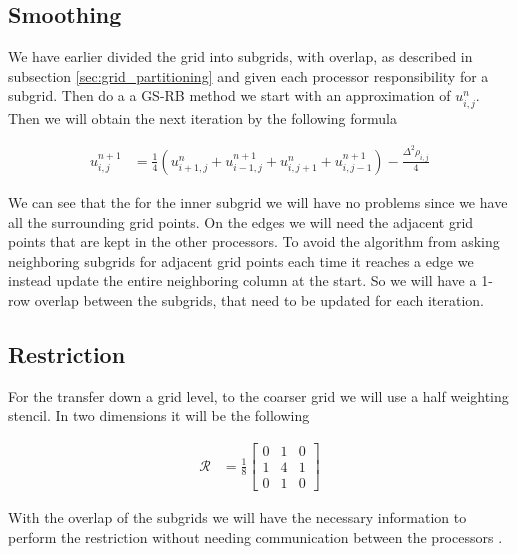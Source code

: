 	\subsection{Smoothing}

		We have earlier divided the grid into subgrids, with overlap, as described in subsection \ref{sec:grid_partitioning} and given each processor responsibility for a subgrid. Then do a a GS-RB method we start with an approximation of \(u^{n}_{i,j}\). Then we will obtain the next iteration by the following formula

		\begin{align}
			u^{n+1}_{i,j} &= \frac{1}{4}\left( u^n_{i+1,j} + u^{n +1}_{i-1,j} + u^{n}_{i, j+1} + u^{n+1}_{i,j-1}  \right) - \frac{\Delta^2 \rho_{i,j}}{4}
		\end{align}

		We can see that the for the inner subgrid we will have no problems since we have all the surrounding grid points. On the edges we will need the adjacent grid points that are kept in the other processors. To avoid the algorithm from asking neighboring subgrids for adjacent grid points each time it reaches a edge we instead update the entire neighboring column at the start. So we will have a 1-row overlap between the subgrids, that need to be updated for each iteration.


	\subsection{Restriction}
		For the transfer down a grid level, to the coarser grid we will use a half weighting stencil. In two dimensions it will be the following

		\begin{align}
			\mathcal{R} &= \frac{1}{8}
			\begin{bmatrix}
				0 & 1 & 0
				\\
				1 & 4 & 1
				\\
				0 & 1 & 0
			\end{bmatrix}
		\end{align}

		With the overlap of the subgrids we will have the necessary information to perform the restriction without needing communication between the processors \citep{hackbusch_multigrid_1982}.

